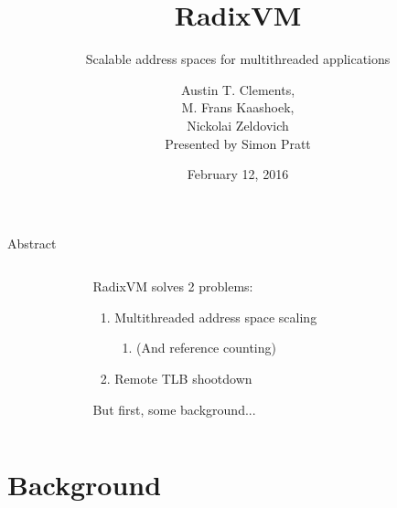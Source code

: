 \documentclass[aspectratio=169]{beamer}
\title{RadixVM}
\subtitle{Scalable address spaces for multithreaded applications}
\author[Presented by Simon Pratt]{Austin T. Clements,\\M. Frans Kaashoek,\\Nickolai Zeldovich\\
  \vspace{2em}Presented by Simon Pratt}
\date{February 12, 2016}
\newcommand{\bn}{\begin{enumerate}}
\newcommand{\en}{\end{enumerate}}
\begin{document}
\frame[plain]{\titlepage}

\begin{frame}{Abstract}
  \begin{columns}[T]
    \begin{column}{0.3\textwidth}
    \end{column}
    \begin{column}{0.4\textwidth}
      RadixVM solves 2 problems:
      \bn
      \pause
    \item Multithreaded address space scaling
      \bn
      \pause
    \item (And reference counting)
      \en
      \pause
    \item Remote TLB shootdown
      \en
      \vspace{2em}
      \pause
      But first, some background...
    \end{column}
    \begin{column}{0.3\textwidth}
    \end{column}
  \end{columns}
\end{frame}

\newpage

\section{Background}
\end{document}
